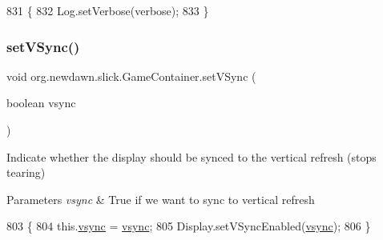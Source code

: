 \begin{DoxyCode}
831                                             \{
832         Log.setVerbose(verbose);
833     \}
\end{DoxyCode}
\mbox{\label{classorg_1_1newdawn_1_1slick_1_1_game_container_a2040e2501faab435d19ba4cc412b8c95}} 
\subsubsection{\texorpdfstring{set\+V\+Sync()}{setVSync()}}
{\footnotesize\ttfamily void org.\+newdawn.\+slick.\+Game\+Container.\+set\+V\+Sync (\begin{DoxyParamCaption}\item[{boolean}]{vsync }\end{DoxyParamCaption})\hspace{0.3cm}{\ttfamily [inline]}}

Indicate whether the display should be synced to the vertical refresh (stops tearing)


\begin{DoxyParams}{Parameters}
{\em vsync} & True if we want to sync to vertical refresh \\
\hline
\end{DoxyParams}

\begin{DoxyCode}
803                                         \{
804         this.\mbox{\hyperlink{classorg_1_1newdawn_1_1slick_1_1_game_container_a1a1161c9e75a47325ad0256583fee409}{vsync}} = \mbox{\hyperlink{classorg_1_1newdawn_1_1slick_1_1_game_container_a1a1161c9e75a47325ad0256583fee409}{vsync}};
805         Display.setVSyncEnabled(\mbox{\hyperlink{classorg_1_1newdawn_1_1slick_1_1_game_container_a1a1161c9e75a47325ad0256583fee409}{vsync}});
806     \}
\end{DoxyCode}
\mbox{\label{classorg_1_1newdawn_1_1slick_1_1_game_container_ae52a0a34f747d41704fb1353c3d4447b}} 
